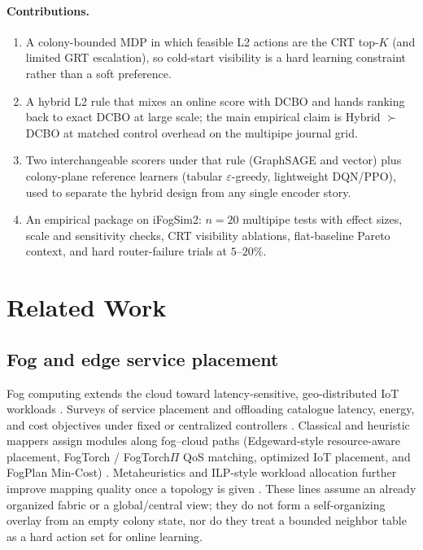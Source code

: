 \documentclass[pdflatex,sn-mathphys-num,iicol]{sn-jnl}
\begin{document}
\paragraph{Contributions.}
\begin{enumerate}
\item A colony-bounded MDP in which feasible L2 actions are the CRT top-$K$
(and limited GRT escalation), so cold-start visibility is a hard learning
constraint rather than a soft preference.
\item A hybrid L2 rule that mixes an online score with DCBO and hands ranking
back to exact DCBO at large scale; the main empirical claim is Hybrid $\succ$
DCBO at matched control overhead on the multipipe journal grid.
\item Two interchangeable scorers under that rule (GraphSAGE and vector) plus
colony-plane reference learners (tabular $\varepsilon$-greedy, lightweight
DQN/PPO), used to separate the hybrid design from any single encoder story.
\item An empirical package on iFogSim2: $n{=}20$ multipipe tests with effect
sizes, scale and sensitivity checks, CRT visibility ablations, flat-baseline
Pareto context, and hard router-failure trials at $5$--$20\%$.
\end{enumerate}

\section{Related Work}
\label{sec:rw}

\subsection{Fog and edge service placement}
Fog computing extends the cloud toward latency-sensitive, geo-distributed IoT
workloads \cite{bonomi_mcc2012,chiang_jiot2016,mouradian_comst2018,naha_access2018_fog}.
Surveys of service placement and offloading catalogue latency, energy, and cost
objectives under fixed or centralized controllers
\cite{salaht_csur2020,smolka_computing2022_eval,gasmi_jsup2021_survey,taleb_csur2025_survey,apat_computers2025_survey,yousefpour_sysarc2019}.
Classical and heuristic mappers assign modules along fog--cloud paths
(Edgeward-style resource-aware placement, FogTorch / FogTorch$\Pi$ QoS matching,
optimized IoT placement, and FogPlan Min-Cost)
\cite{taneja_im2017_edgeward,brogi_jiot2017_fogtorch,brogi_icfec2017_fogtorchpi,skarlat_icfec2017,skarlat_soca2017,yousefpour_fogplan_jiot2019}.
Metaheuristics and ILP-style workload allocation further improve mapping quality
once a topology is given
\cite{azimzadeh_cluster2022_genetic,benamer_cluster2024_ga,deng_jiot2016_workload,guerrero_fgcs2019_evolutionary}.
These lines assume an already organized fabric or a global/central view; they do
not form a self-organizing overlay from an empty colony state, nor do they treat
a bounded neighbor table as a hard action set for online learning.
\end{document}
